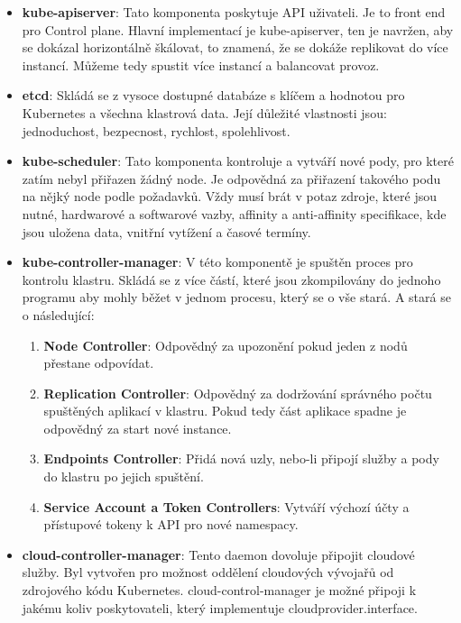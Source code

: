\begin{itemize}

	\item \textbf{kube-apiserver}: Tato komponenta poskytuje API uživateli. Je to front end pro Control plane. Hlavní implementací je kube-apiserver, ten je navržen, aby se dokázal horizontálně škálovat, to znamená, že se dokáže replikovat do více instancí. Můžeme tedy spustit více instancí a balancovat provoz. 

	\item \textbf{etcd}: Skládá se z vysoce dostupné databáze s klíčem a hodnotou pro Kubernetes a všechna klastrová data. Její důležité vlastnosti jsou: jednoduchost, bezpecnost, rychlost, spolehlivost. 

	\item \textbf{kube-scheduler}: Tato komponenta kontroluje a vytváří nové pody, pro které zatím nebyl přiřazen žádný node. Je odpovědná za přiřazení takového podu na nějký node podle požadavků. Vždy musí brát v potaz zdroje, které jsou nutné, hardwarové a softwarové vazby, affinity a anti-affinity specifikace, kde jsou uložena data, vnitřní vytížení a časové termíny.

	\item \textbf{kube-controller-manager}: V této komponentě je spuštěn proces pro kontrolu klastru. Skládá se z více částí, které jsou zkompilovány do jednoho programu aby mohly běžet v jednom procesu, který se o vše stará. A stará se o následující:
	\begin{enumerate}

		\item \textbf{Node Controller}: Odpovědný za upozonění pokud jeden z nodů přestane odpovídat.

		\item \textbf{Replication Controller}: Odpovědný za dodržování správného počtu spuštěných aplikací v klastru. Pokud tedy část aplikace spadne je odpovědný za start nové instance.

		\item \textbf{Endpoints Controller}: Přidá nová uzly, nebo-li připojí služby a pody do klastru po jejich spuštění. 
	
		\item \textbf{Service Account a Token Controllers}: Vytváří výchozí účty a přístupové tokeny k API pro nové namespacy. 
	\end{enumerate}
	
	\item \textbf{cloud-controller-manager}: Tento daemon dovoluje připojit cloudové služby. Byl vytvořen pro možnost oddělení cloudových vývojařů od zdrojového kódu Kubernetes. cloud-control-manager je možné připoji k jakému koliv poskytovateli, který implementuje cloudprovider.interface.
\end{itemize}

